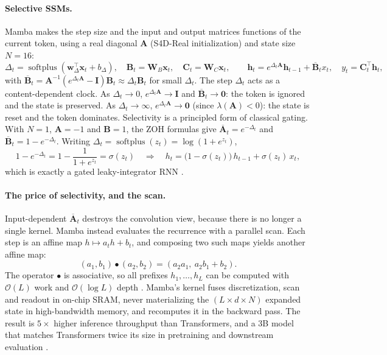 \documentclass[a4paper]{article}
\newcommand{\T}{^{\top}}
\newcommand{\vx}{\mathbf{x}}
\newcommand{\vh}{\mathbf{h}}
\newcommand{\mA}{\mathbf{A}}
\newcommand{\mB}{\mathbf{B}}
\newcommand{\mC}{\mathbf{C}}
\newcommand{\mI}{\mathbf{I}}
\newcommand{\Ab}{\overline{\mathbf{A}}}
\newcommand{\Bb}{\overline{\mathbf{B}}}
\DeclareMathOperator{\softplus}{softplus}
\newcommand{\bigO}{\mathcal{O}}
\theoremstyle{plain}
\theoremstyle{remark}
\begin{document}
\paragraph{Selective SSMs.} Mamba \citep{gu2024mamba} makes the step size and the input and output matrices functions of the current token, using a real diagonal $\mA$ (S4D-Real initialization) and state size $N{=}16$:
\begin{equation}
\label{eq:selective}
\Delta_t=\softplus(\mathbf{w}_\Delta\T\vx_t+b_\Delta),\quad \mB_t=\mathbf{W}_B\vx_t,\quad \mC_t=\mathbf{W}_C\vx_t,\qquad \vh_t=e^{\Delta_t\mA}\vh_{t-1}+\Bb_t x_t,\quad y_t=\mC_t\T\vh_t,
\end{equation}
with $\Bb_t=\mA^{-1}(e^{\Delta_t\mA}-\mI)\mB_t\approx\Delta_t\mB_t$ for small $\Delta_t$. The step $\Delta_t$ acts as a content-dependent clock. As $\Delta_t\to0$, $e^{\Delta_t\mA}\to\mI$ and $\Bb_t\to\mathbf{0}$: the token is ignored and the state is preserved. As $\Delta_t\to\infty$, $e^{\Delta_t\mA}\to\mathbf{0}$ (since $\lambda(\mA)<0$): the state is reset and the token dominates. Selectivity is a principled form of classical gating. With $N=1$, $\mA=-1$ and $\mB=1$, the ZOH formulas give $\Ab_t=e^{-\Delta_t}$ and $\Bb_t=1-e^{-\Delta_t}$. Writing $\Delta_t=\softplus(z_t)=\log(1+e^{z_t})$,
\begin{equation}
\label{eq:gate}
1-e^{-\Delta_t}=1-\frac{1}{1+e^{z_t}}=\sigma(z_t)\quad\Longrightarrow\quad h_t=\big(1-\sigma(z_t)\big)\,h_{t-1}+\sigma(z_t)\,x_t ,
\end{equation}
which is exactly a gated leaky-integrator RNN \citep[Thm.~1]{gu2024mamba}.

\paragraph{The price of selectivity, and the scan.} Input-dependent $\Ab_t$ destroys the convolution view, because there is no longer a single kernel. Mamba instead evaluates the recurrence with a parallel scan. Each step is an affine map $h\mapsto a_th+b_t$, and composing two such maps yields another affine map:
\begin{equation}
\label{eq:scan}
(a_1,b_1)\bullet(a_2,b_2)=(a_2a_1,\ a_2b_1+b_2).
\end{equation}
The operator $\bullet$ is associative, so all prefixes $h_1,\dots,h_L$ can be computed with $\bigO(L)$ work and $\bigO(\log L)$ depth \citep{blelloch1990prefix,martin2018parallelizing}. Mamba's kernel fuses discretization, scan and readout in on-chip SRAM, never materializing the $(L\times d\times N)$ expanded state in high-bandwidth memory, and recomputes it in the backward pass. The result is $5\times$ higher inference throughput than Transformers, and a 3B model that matches Transformers twice its size in pretraining and downstream evaluation \citep{gu2024mamba}.
\end{document}
